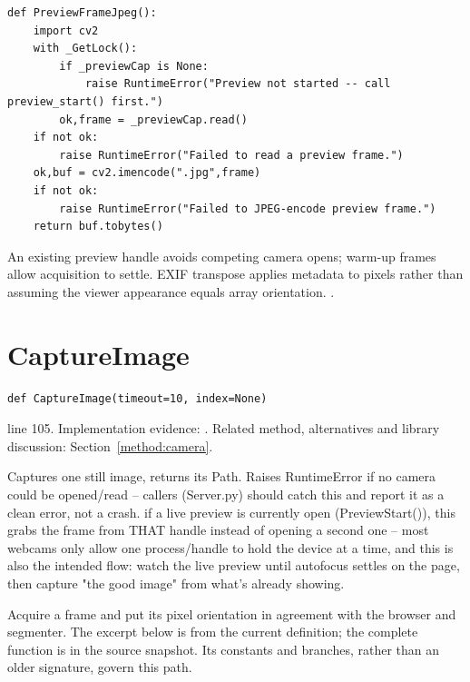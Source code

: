 \begin{lstlisting}[style=plain]
def PreviewFrameJpeg():
    import cv2
    with _GetLock():
        if _previewCap is None:
            raise RuntimeError("Preview not started -- call preview_start() first.")
        ok,frame = _previewCap.read()
    if not ok:
        raise RuntimeError("Failed to read a preview frame.")
    ok,buf = cv2.imencode(".jpg",frame)
    if not ok:
        raise RuntimeError("Failed to JPEG-encode preview frame.")
    return buf.tobytes()
\end{lstlisting}
An existing preview handle avoids competing camera opens; warm-up frames allow acquisition to settle. EXIF transpose applies metadata to pixels rather than assuming the viewer appearance equals array orientation. \cite{opencvcamera,pillowops}.


\section{CaptureImage}\label{fn:web-camera:CaptureImage}
\begin{lstlisting}[style=sig]
def CaptureImage(timeout=10, index=None)
\end{lstlisting}
 line 105. Implementation evidence: \cite{code2026}. Related method, alternatives and library discussion: Section~\ref{method:camera}.


Captures one still image, returns its Path. Raises RuntimeError if no camera could be opened/read -- callers (Server.py) should catch this and report it as a clean error, not a crash. if a live preview is currently open (PreviewStart()), this grabs the frame from THAT handle instead of opening a second one -- most webcams only allow one process/handle to hold the device at a time, and this is also the intended flow: watch the live preview until autofocus settles on the page, then capture "the good image" from what's already showing.


Acquire a frame and put its pixel orientation in agreement with the browser and segmenter. The excerpt below is from the current definition; the complete function is in the source snapshot. Its constants and branches, rather than an older signature, govern this path.


